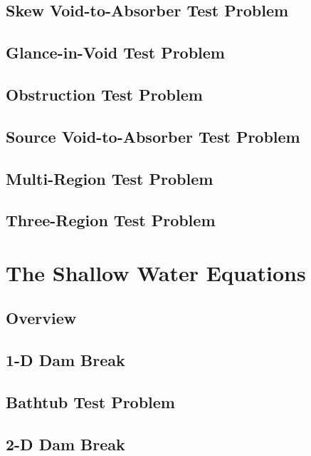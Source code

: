 \subsection{Skew Void-to-Absorber Test Problem\label{sec:skew_void_to_absorber}}
  
\subsection{Glance-in-Void Test Problem\label{sec:glance_in_void}}
  
\subsection{Obstruction Test Problem\label{sec:obstruction}}
  
\subsection{Source Void-to-Absorber Test Problem\label{sec:source_void_to_absorber}}
  
\subsection{Multi-Region Test Problem\label{sec:multi_region}}
  
\subsection{Three-Region Test Problem\label{sec:three_region}}
  
\section{The Shallow Water Equations\label{sec:shallow_water_results}}
\subsection{Overview}
  
\subsection{1-D Dam Break\label{sec:dam_break_1d}}
  
\subsection{Bathtub Test Problem\label{sec:bathtub}}
  
\subsection{2-D Dam Break\label{sec:dam_break_2d}}
  
